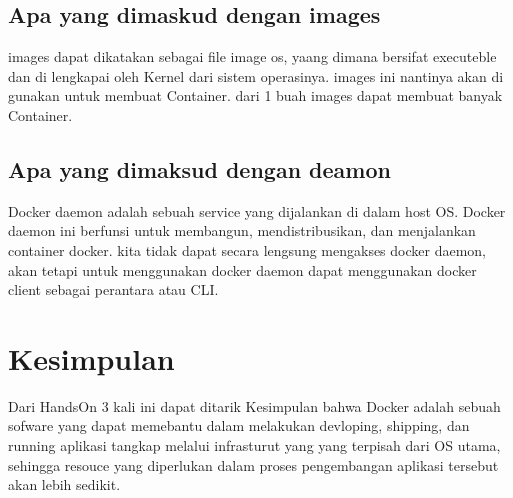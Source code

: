 \documentclass[11pt,a4paper]{article}
\begin{document}
\subsection{Apa yang dimaskud dengan images}
images dapat dikatakan sebagai file image os, yaang dimana bersifat executeble dan di lengkapai 
oleh Kernel dari sistem operasinya. images ini nantinya akan di gunakan untuk membuat Container.
dari 1 buah images dapat membuat banyak Container.

\subsection{Apa yang dimaksud dengan deamon}
Docker daemon adalah sebuah service yang dijalankan di dalam host OS. Docker daemon ini
berfunsi untuk membangun, mendistribusikan, dan menjalankan container docker.
kita tidak dapat secara lengsung mengakses docker daemon, akan tetapi untuk menggunakan docker
daemon dapat menggunakan docker client sebagai perantara atau CLI.


\section{Kesimpulan}
Dari HandsOn 3 kali ini dapat ditarik Kesimpulan bahwa Docker adalah sebuah sofware yang 
dapat memebantu dalam melakukan devloping, shipping, dan running aplikasi tangkap melalui
infrasturut yang yang terpisah dari OS utama, sehingga resouce yang diperlukan 
dalam proses pengembangan aplikasi tersebut akan lebih sedikit.

\newpage


\end{document}
